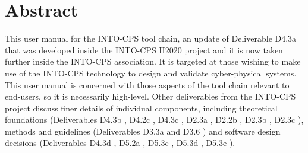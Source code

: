\documentclass[a4paper,12pt,final]{include/intocpsassociation}   %
\newenvironment{assumption}{\noindent\smallskip\color{blue}\begin{framed}\begin{minipage}{0.95\columnwidth}}{\end{minipage}\end{framed}\smallskip\par}
\begin{document}
\maketitle
%
%
%
\section*{Abstract}
\label{sec:abstract}
%
This user manual for the INTO-CPS tool chain, an update of Deliverable D4.3a \cite{INTOCPSD4.3a} that was developed inside the INTO-CPS H2020 project and it is now taken further inside the INTO-CPS association.
%
It is targeted at those wishing to make use of the INTO-CPS technology to design and validate cyber-physical systems.
%
This user manual is concerned with those aspects of the tool chain relevant to end-users, so it is necessarily high-level.
%
Other deliverables from the INTO-CPS project discuss finer details of individual components, including theoretical foundations (Deliverables D4.3b \cite{INTOCPSD4.3b}, D4.2c \cite{INTOCPSD4.2c}, D4.3c \cite{INTOCPSD4.3c}, D2.3a \cite{INTOCPSD2.3a}, D2.2b \cite{INTOCPSD2.2b}, D2.3b \cite{INTOCPSD2.3b}, D2.3c \cite{INTOCPSD2.3c}), methods and guidelines (Deliverables D3.3a \cite{INTOCPSD3.3a} and D3.6 \cite{INTOCPSD3.6}) and software design decisions (Deliverables D4.3d \cite{INTOCPSD4.3d}, D5.2a \cite{INTOCPSD5.2a}, D5.3c \cite{INTOCPSD5.3c}, D5.3d \cite{INTOCPSD5.3d}, D5.3e \cite{INTOCPSD5.3e}).
%
\newpage
%
\tableofcontents
\newpage
%
%
%
%
%
%

\clearpage

\clearpage

\clearpage

\clearpage

\clearpage

\clearpage %

\clearpage

\clearpage %

\clearpage

\clearpage

\clearpage
%
%
%
%

 
\label{ch:bib} %
%
%
%
\clearpage
%
%
%
\appendix

\clearpage

\clearpage

%
%
%
\end{document}
